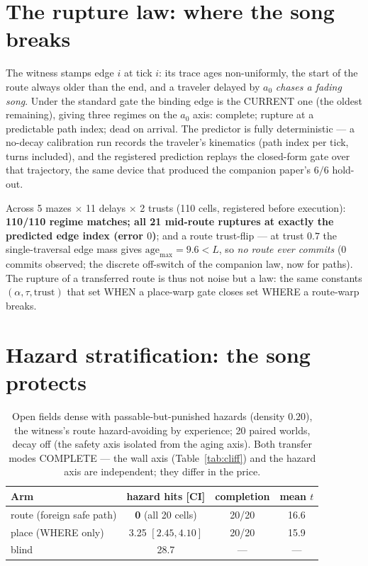 \documentclass{article}
\begin{document}
\section{The rupture law: where the song breaks}
\label{sec:rupture}

The witness stamps edge $i$ at tick $i$: its trace ages
non-uniformly, the start of the route always older than the end, and
a traveler delayed by $a_0$ \emph{chases a fading song}. Under the
standard gate the binding edge is the CURRENT one (the oldest
remaining), giving three regimes on the $a_0$ axis: complete;
rupture at a predictable path index; dead on arrival. The predictor
is fully deterministic --- a no-decay calibration run records the
traveler's kinematics (path index per tick, turns included), and the
registered prediction replays the closed-form gate over that
trajectory, the same device that produced the companion paper's
$6/6$ hold-out.

Across 5 mazes $\times$ 11 delays $\times$ 2 trusts (110 cells,
registered before execution): \textbf{110/110 regime matches; all 21
mid-route ruptures at exactly the predicted edge index (error $0$)};
and a route trust-flip --- at trust $0.7$ the single-traversal edge
mass gives $\mathrm{age}_{\max} = 9.6 < L$, so \emph{no route ever
commits} (0 commits observed; the discrete off-switch of the
companion law, now for paths). The rupture of a transferred route is
thus not noise but a law: the same constants
$(\alpha,\tau,\text{trust})$ that set WHEN a place-warp gate closes
set WHERE a route-warp breaks.

\section{Hazard stratification: the song protects}
\label{sec:hazard}

\begin{table}[h]
\centering
\caption{Open fields dense with passable-but-punished hazards
(density $0.20$), the witness's route hazard-avoiding by experience;
20 paired worlds, decay off (the safety axis isolated from the aging
axis). Both transfer modes COMPLETE --- the wall axis
(Table~\ref{tab:cliff}) and the hazard axis are independent; they
differ in the price.}
\label{tab:hazard}
\small
\begin{tabular}{lccc}
\toprule
Arm & hazard hits [CI] & completion & mean $t$ \\
\midrule
route (foreign safe path) & \textbf{0} (all 20 cells) & 20/20 & 16.6 \\
place (WHERE only) & 3.25 $[2.45, 4.10]$ & 20/20 & 15.9 \\
blind & 28.7 & --- & --- \\
\bottomrule
\end{tabular}
\end{table}
\end{document}

